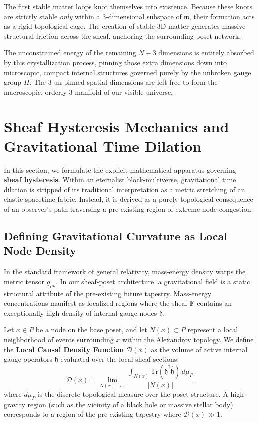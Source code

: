 \documentclass[12pt,letterpaper]{article}
\begin{document}
The first stable matter loops knot themselves into existence. Because these knots are strictly stable \textit{only} within a 3-dimensional subspace of $\mathfrak{m}$, their formation acts as a rigid topological cage. The creation of stable 3D matter generates massive structural friction across the sheaf, anchoring the surrounding poset network.

The unconstrained energy of the remaining $N-3$ dimensions is entirely absorbed by this crystallization process, pinning those extra dimensions down into microscopic, compact internal structures governed purely by the unbroken gauge group $H$. The 3 un-pinned spatial dimensions are left free to form the macroscopic, orderly 3-manifold of our visible universe.

\section{Sheaf Hysteresis Mechanics and Gravitational Time Dilation}

In this section, we formulate the explicit mathematical apparatus governing \textbf{sheaf hysteresis}. Within an eternalist block-multiverse, gravitational time dilation is stripped of its traditional interpretation as a metric stretching of an elastic spacetime fabric. Instead, it is derived as a purely topological consequence of an observer's path traversing a pre-existing region of extreme node congestion.

\subsection{Defining Gravitational Curvature as Local Node Density}
In the standard framework of general relativity, mass-energy density warps the metric tensor $g_{\mu\nu}$. In our sheaf-poset architecture, a gravitational field is a static structural attribute of the pre-existing future tapestry. Mass-energy concentrations manifest as localized regions where the sheaf $\mathbf{F}$ contains an exceptionally high density of internal gauge nodes $\mathfrak{h}$.

Let $x \in P$ be a node on the base poset, and let $N(x) \subset P$ represent a local neighborhood of events surrounding $x$ within the Alexandrov topology. We define the \textbf{Local Causal Density Function} $\mathcal{D}(x)$ as the volume of active internal gauge operators $\mathfrak{h}$ evaluated over the local sheaf sections:
$$\mathcal{D}(x) = \lim_{N(x) \to x} \frac{\int_{N(x)} \text{Tr}(\hat{\mathfrak{h}}^\dagger \hat{\mathfrak{h}}) \, d\mu_P}{|N(x)|}$$
where $d\mu_P$ is the discrete topological measure over the poset structure. A high-gravity region (such as the vicinity of a black hole or massive stellar body) corresponds to a region of the pre-existing tapestry where $\mathcal{D}(x) \gg 1$.
\end{document}
